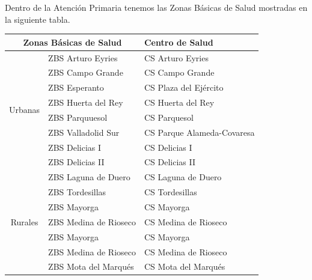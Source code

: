Dentro de la Atención Primaria tenemos las Zonas Básicas de Salud mostradas en la siguiente tabla.

\begin{table}[H]
    \centering
    \begin{tabular}{cll}
        \toprule
        \multicolumn{2}{c}{Zonas   Básicas de Salud} & Centro de Salud                                      \\
        \midrule
        \multirow{8}{*}{Urbanas}                     & ZBS Arturo Eyries       & CS Arturo Eyries           \\
                                                     & ZBS Campo Grande        & CS Campo Grande            \\
                                                     & ZBS Esperanto           & CS Plaza del Ejército      \\
                                                     & ZBS Huerta del Rey      & CS Huerta del Rey          \\
                                                     & ZBS Parquuesol          & CS Parquesol               \\
                                                     & ZBS Valladolid Sur      & CS Parque Alameda-Covaresa \\
                                                     & ZBS Delicias I          & CS Delicias I              \\
                                                     & ZBS Delicias II         & CS Delicias II             \\
        \midrule
        \multirow{11}{*}{Rurales}                    & ZBS Laguna de Duero     & CS Laguna de Duero         \\
                                                     & ZBS Tordesillas         & CS Tordesillas             \\
                                                     & ZBS Mayorga             & CS Mayorga                 \\
                                                     & ZBS Medina de Rioseco   & CS Medina de Rioseco       \\
                                                     & ZBS Mayorga             & CS Mayorga                 \\
                                                     & ZBS Medina de Rioseco   & CS Medina de Rioseco       \\
                                                     & ZBS Mota del Marqués    & CS Mota del Marqués        \\

\end{tabular}
\end{table}
